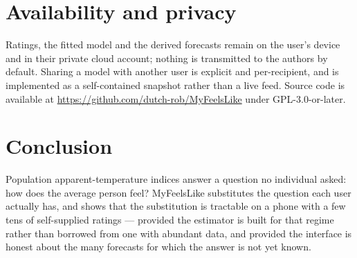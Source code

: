 \documentclass[11pt]{article}
\begin{document}
\section{Availability and privacy}

Ratings, the fitted model and the derived forecasts remain on the user's
device and in their private cloud account; nothing is transmitted to the
authors by default. Sharing a model with another user is explicit and
per-recipient, and is implemented as a self-contained snapshot rather than a
live feed. Source code is available at
\url{https://github.com/dutch-rob/MyFeelsLike} under GPL-3.0-or-later.

\section{Conclusion}

Population apparent-temperature indices answer a question no individual asked:
how does the average person feel? MyFeelsLike substitutes the question each
user actually has, and shows that the substitution is tractable on a phone with
a few tens of self-supplied ratings --- provided the estimator is built for
that regime rather than borrowed from one with abundant data, and provided the
interface is honest about the many forecasts for which the answer is not yet
known.
\end{document}
